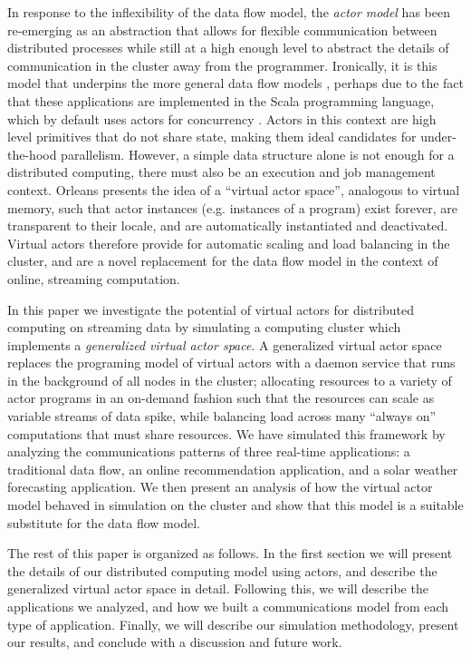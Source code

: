 \documentclass[conference,twocolumn,11pt]{IEEEtran}
\begin{document}
In response to the inflexibility of the data flow model, the \textit{actor model} \cite{hewitt_viewing_1977, agha_actors:_1985} has been re-emerging as an abstraction that allows for flexible communication between distributed processes while still at a high enough level to abstract the details of communication in the cluster away from the programmer. Ironically, it is this model that underpins the more general data flow models \cite{gonzalez_asynchronous_2015}, perhaps due to the fact that these applications are implemented in the Scala programming language, which by default uses actors for concurrency \cite{haller_scala_2009,karmani_actor_2009}. Actors in this context are high level primitives that do not share state, making them ideal candidates for under-the-hood parallelism. However, a simple data structure alone is not enough for a distributed computing, there must also be an execution and job management context. Orleans \cite{bernstein_orleans:_????} presents the idea of a ``virtual actor space'', analogous to virtual memory, such that actor instances (e.g. instances of a program) exist forever, are transparent to their locale, and are automatically instantiated and deactivated. Virtual actors therefore provide for automatic scaling and load balancing in the cluster, and are a novel replacement for the data flow model in the context of online, streaming computation.

In this paper we investigate the potential of virtual actors for distributed computing on streaming data by simulating a computing cluster which implements a \textit{generalized virtual actor space}. A generalized virtual actor space replaces the programing model of virtual actors with a daemon service that runs in the background of all nodes in the cluster; allocating resources to a variety of actor programs in an on-demand fashion such that the resources can scale as variable streams of data spike, while balancing load across many ``always on'' computations that must share resources. We have simulated this framework by analyzing the communications patterns of three real-time applications: a traditional data flow, an online recommendation application, and a solar weather forecasting application. We then present an analysis of how the virtual actor model behaved in simulation on the cluster and show that this model is a suitable substitute for the data flow model.

The rest of this paper is organized as follows. In the first section we will present the details of our distributed computing model using actors, and describe the generalized virtual actor space in detail. Following this, we will describe the applications we analyzed, and how we built a communications model from each type of application. Finally, we will describe our simulation methodology, present our results, and conclude with a discussion and future work.
\end{document}
